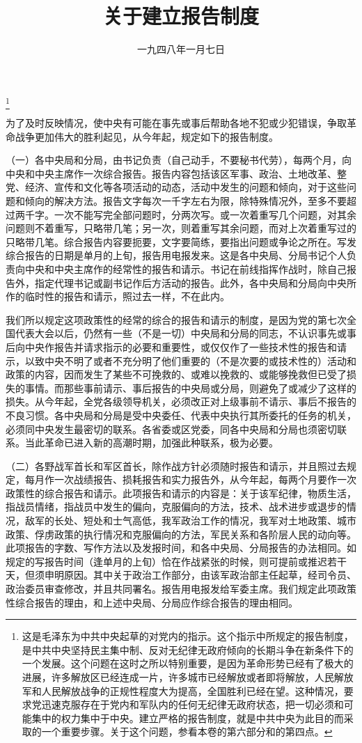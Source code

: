
\title{关于建立报告制度}
\date{一九四八年一月七日}
\thanks{这是毛泽东为中共中央起草的对党内的指示。这个指示中所规定的报告制度，是中共中央坚持民主集中制、反对无纪律无政府倾向的长期斗争在新条件下的一个发展。这个问题在这时之所以特别重要，是因为革命形势已经有了极大的进展，许多解放区已经连成一片，许多城市已经解放或者即将解放，人民解放军和人民解放战争的正规性程度大为提高，全国胜利已经在望。这种情况，要求党迅速克服存在于党内和军队内的任何无纪律无政府状态，把一切必须和可能集中的权力集中于中央。建立严格的报告制度，就是中共中央为此目的而采取的一个重要步骤。关于这个问题，参看本卷的第六部分和的第四点。}
\maketitle


为了及时反映情况，使中央有可能在事先或事后帮助各地不犯或少犯错误，争取革命战争更加伟大的胜利起见，从今年起，规定如下的报告制度。

（一）各中央局和分局，由书记负责（自己动手，不要秘书代劳），每两个月，向中央和中央主席作一次综合报告。报告内容包括该区军事、政治、土地改革、整党、经济、宣传和文化等各项活动的动态，活动中发生的问题和倾向，对于这些问题和倾向的解决方法。报告文字每次一千字左右为限，除特殊情况外，至多不要超过两千字。一次不能写完全部问题时，分两次写。或一次着重写几个问题，对其余问题则不着重写，只略带几笔；另一次，则着重写其余问题，而对上次着重写过的只略带几笔。综合报告内容要扼要，文字要简练，要指出问题或争论之所在。写发综合报告的日期是单月的上旬，报告用电报发来。这是各中央局、分局书记个人负责向中央和中央主席作的经常性的报告和请示。书记在前线指挥作战时，除自己报告外，指定代理书记或副书记作后方活动的报告。此外，各中央局和分局向中央所作的临时性的报告和请示，照过去一样，不在此内。

我们所以规定这项政策性的经常的综合的报告和请示的制度，是因为党的第七次全国代表大会以后，仍然有一些（不是一切）中央局和分局的同志，不认识事先或事后向中央作报告并请求指示的必要和重要性，或仅仅作了一些技术性的报告和请示，以致中央不明了或者不充分明了他们重要的（不是次要的或技术性的）活动和政策的内容，因而发生了某些不可挽救的、或难以挽救的、或能够挽救但已受了损失的事情。而那些事前请示、事后报告的中央局或分局，则避免了或减少了这样的损失。从今年起，全党各级领导机关，必须改正对上级事前不请示、事后不报告的不良习惯。各中央局和分局是受中央委任、代表中央执行其所委托的任务的机关，必须同中央发生最密切的联系。各省委或区党委，同各中央局和分局也须密切联系。当此革命已进入新的高潮时期，加强此种联系，极为必要。

（二）各野战军首长和军区首长，除作战方针必须随时报告和请示，并且照过去规定，每月作一次战绩报告、损耗报告和实力报告外，从今年起，每两个月要作一次政策性的综合报告和请示。此项报告和请示的内容是：关于该军纪律，物质生活，指战员情绪，指战员中发生的偏向，克服偏向的方法，技术、战术进步或退步的情况，敌军的长处、短处和士气高低，我军政治工作的情况，我军对土地政策、城市政策、俘虏政策的执行情况和克服偏向的方法，军民关系和各阶层人民的动向等。此项报告的字数、写作方法以及发报时间，和各中央局、分局报告的办法相同。如规定的写报告时间（逢单月的上旬）恰在作战紧张的时候，则可提前或推迟若干天，但须申明原因。其中关于政治工作部分，由该军政治部主任起草，经司令员、政治委员审查修改，并且共同署名。报告用电报发给军委主席。我们规定此项政策性综合报告的理由，和上述中央局、分局应作综合报告的理由相同。
